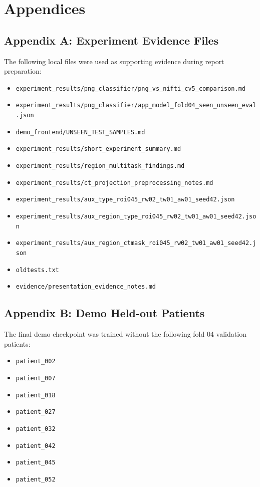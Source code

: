 \chapter*{Appendices}

\section*{Appendix A: Experiment Evidence Files}

The following local files were used as supporting evidence during report preparation:

\begin{itemize}
    \item \texttt{experiment\_results/png\_classifier/png\_vs\_nifti\_cv5\_comparison.md}
    \item \texttt{experiment\_results/png\_classifier/app\_model\_fold04\_seen\_unseen\_eval.json}
    \item \texttt{demo\_frontend/UNSEEN\_TEST\_SAMPLES.md}
    \item \texttt{experiment\_results/short\_experiment\_summary.md}
    \item \texttt{experiment\_results/region\_multitask\_findings.md}
    \item \texttt{experiment\_results/ct\_projection\_preprocessing\_notes.md}
    \item \texttt{experiment\_results/aux\_type\_roi045\_rw02\_tw01\_aw01\_seed42.json}
    \item \texttt{experiment\_results/aux\_region\_type\_roi045\_rw02\_tw01\_aw01\_seed42.json}
    \item \texttt{experiment\_results/aux\_region\_ctmask\_roi045\_rw02\_tw01\_aw01\_seed42.json}
    \item \texttt{oldtests.txt}
    \item \texttt{evidence/presentation\_evidence\_notes.md}
\end{itemize}

\section*{Appendix B: Demo Held-out Patients}

The final demo checkpoint was trained without the following fold 04 validation patients:

\begin{itemize}
    \item \texttt{patient\_002}
    \item \texttt{patient\_007}
    \item \texttt{patient\_018}
    \item \texttt{patient\_027}
    \item \texttt{patient\_032}
    \item \texttt{patient\_042}
    \item \texttt{patient\_045}
    \item \texttt{patient\_052}
\end{itemize}
